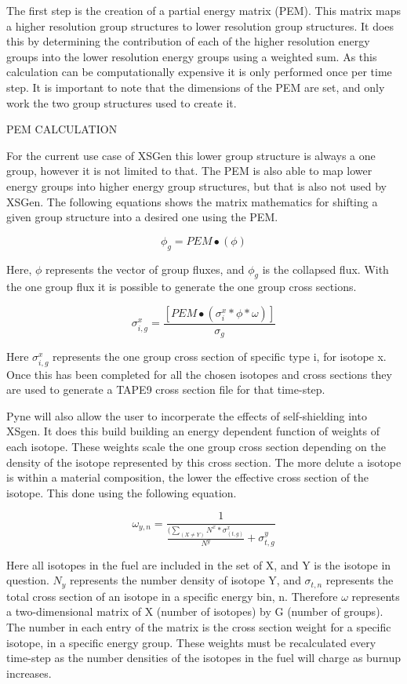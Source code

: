 \documentclass{article}
\begin{document}
The first step is the creation of a partial energy matrix (PEM). This matrix maps a higher resolution group structures to lower resolution group structures. It does this by determining the contribution of each of the higher resolution energy groups into the lower resolution energy groups using a weighted sum. As this calculation can be computationally expensive it is only performed once per time step. It is important to note that the dimensions of the PEM are set, and only work the two group structures used to create it. 

PEM CALCULATION

For the current use case of XSGen this lower group structure is always a one group, however it is not limited to that. The PEM is also able to map lower energy groups into higher energy group structures, but that is also not used by XSGen. The following equations shows the matrix mathematics for shifting a given group structure into a desired one using the PEM. 

$$\phi_g = PEM ∙(\phi)$$

Here, \begin{math}\phi\end{math} represents the vector of group fluxes, and $\phi_g$ is the collapsed flux. With the one group flux it is possible to generate the one group cross sections. 

$$\sigma_{i,g}^x=\frac{[PEM∙(\sigma_i^x*\phi*\omega)]}{\sigma_g} $$

Here $\sigma_{i,g}^x$ represents the one group cross section of specific type i, for isotope x. Once this has been completed for all the chosen isotopes and cross sections they are used to generate a TAPE9 cross section file for that time-step. 

Pyne will also allow the user to incorperate the effects of self-shielding into XSgen. It does this build building an energy dependent function of weights of each isotope. These weights scale the one group cross section depending on the density of the isotope represented by this cross section. The more delute a isotope is within a material composition, the lower the effective cross section of the isotope. This done using the following equation.

$$\omega_{y,n}=\frac{1}{\frac{(\sum_(X\neq Y)N^x * σ_(t,g)^x}{N^y}+\sigma_{t,g}^y}$$

Here all isotopes in the fuel are included in the set of X, and Y is the isotope in question. $N_y$ represents the number density of isotope Y, and $\sigma_{t,n}$ represents the total cross section of an isotope in a specific energy bin, n. Therefore $\omega$ represents a two-dimensional matrix of X (number of isotopes) by G (number of groups). The number in each entry of the matrix is the cross section weight for a specific isotope, in a specific energy group. These weights must be recalculated every time-step as the number densities of the isotopes in the fuel will charge as burnup increases. 
\end{document}
